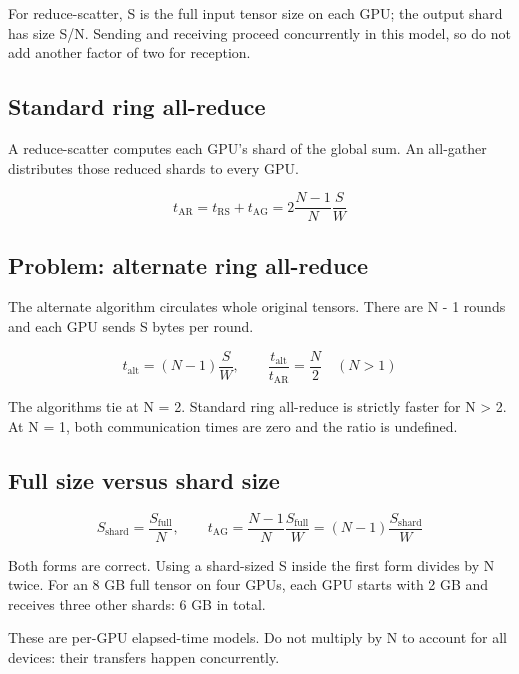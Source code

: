 \documentclass[10pt,a4paper]{article}
\begin{document}
For reduce-scatter, S is the full input tensor size on each GPU; the output shard has size S/N. Sending and receiving proceed concurrently in this model, so do not add another factor of two for reception.\par

\subsection*{Standard ring all-reduce}

A reduce-scatter computes each GPU's shard of the global sum. An all-gather distributes those reduced shards to every GPU.\par

\[\boxed{t_{\mathrm{AR}}=t_{\mathrm{RS}}+t_{\mathrm{AG}}=2\frac{N-1}{N}\frac{S}{W}}\]

\subsection*{Problem: alternate ring all-reduce}

The alternate algorithm circulates whole original tensors. There are N - 1 rounds and each GPU sends S bytes per round.\par

\[\boxed{t_{\mathrm{alt}}=(N-1)\frac{S}{W},\qquad \frac{t_{\mathrm{alt}}}{t_{\mathrm{AR}}}=\frac{N}{2}\quad(N>1)}\]

The algorithms tie at N = 2. Standard ring all-reduce is strictly faster for N > 2. At N = 1, both communication times are zero and the ratio is undefined.\par

\subsection*{Full size versus shard size}

\[S_{\mathrm{shard}}=\frac{S_{\mathrm{full}}}{N},\qquad t_{\mathrm{AG}}=\frac{N-1}{N}\frac{S_{\mathrm{full}}}{W}=(N-1)\frac{S_{\mathrm{shard}}}{W}\]

Both forms are correct. Using a shard-sized S inside the first form divides by N twice. For an 8 GB full tensor on four GPUs, each GPU starts with 2 GB and receives three other shards: 6 GB in total.\par

These are per-GPU elapsed-time models. Do not multiply by N to account for all devices: their transfers happen concurrently.\par
\end{document}
